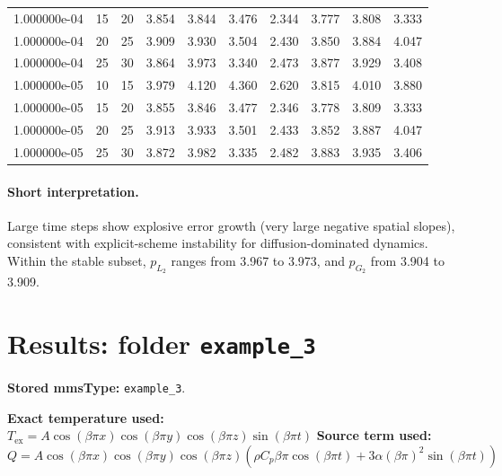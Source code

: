 \documentclass[11pt,a4paper]{article}
\begin{document}
\begin{table}[htbp]
{\begin{tabular}{cccccccccc}
1.000000e-04 & 15 & 20 & 3.854 & 3.844 & 3.476 & 2.344 & 3.777 & 3.808 & 3.333 \\
1.000000e-04 & 20 & 25 & 3.909 & 3.930 & 3.504 & 2.430 & 3.850 & 3.884 & 4.047 \\
1.000000e-04 & 25 & 30 & 3.864 & 3.973 & 3.340 & 2.473 & 3.877 & 3.929 & 3.408 \\
1.000000e-05 & 10 & 15 & 3.979 & 4.120 & 4.360 & 2.620 & 3.815 & 4.010 & 3.880 \\
1.000000e-05 & 15 & 20 & 3.855 & 3.846 & 3.477 & 2.346 & 3.778 & 3.809 & 3.333 \\
1.000000e-05 & 20 & 25 & 3.913 & 3.933 & 3.501 & 2.433 & 3.852 & 3.887 & 4.047 \\
1.000000e-05 & 25 & 30 & 3.872 & 3.982 & 3.335 & 2.482 & 3.883 & 3.935 & 3.406 \\
\bottomrule
\end{tabular}%
}
\end{table}
\paragraph{Short interpretation.}
Large time steps show explosive error growth (very large negative spatial slopes), consistent with explicit-scheme instability for diffusion-dominated dynamics. Within the stable subset, $p_{L_2}$ ranges from 3.967 to 3.973, and $p_{G_2}$ from 3.904 to 3.909.
\section{Results: folder \texttt{example\_3}}
\textbf{Stored mmsType:} \texttt{example\_3}.

\textbf{Exact temperature used:} $T_{\mathrm{ex}} = A\cos(\beta\pi x)\cos(\beta\pi y)\cos(\beta\pi z)\sin(\beta\pi t)$
\textbf{Source term used:} $Q = A\cos(\beta\pi x)\cos(\beta\pi y)\cos(\beta\pi z)\left(\rho C_p\beta\pi\cos(\beta\pi t) + 3\alpha(\beta\pi)^2\sin(\beta\pi t)\right)$
\end{document}
